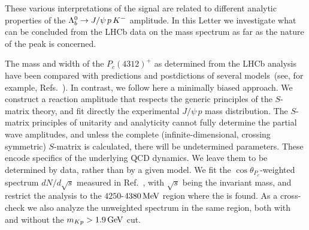 \documentclass[aps,prl,
twocolumn,nofootinbib,
superscriptaddress,preprintnumbers]{revtex4-1}
\begin{document}
These various interpretations of the \Pc signal are related to different analytic properties of the   $\Lambda_b^0 \to J/\psi\,p \,K^-$ amplitude.
   In this Letter we investigate what can be concluded from the LHCb data on the \jpsip mass spectrum as far as the nature of the \Pc peak is concerned. 
   
The mass and width of the $P_c(4312)^+$ as determined from the LHCb analysis have been compared with predictions and postdictions of several models~(see, for example, Refs.~\cite{Chen:2019asm,Chen:2019bip,Guo:2019fdo,Liu:2019tjn,Huang:2019jlf,Ali:2019npk,Giannuzzi:2019esi,Xiao:2019mvs,Shimizu:2019ptd,Guo:2019kdc,Xiao:2019aya}). In contrast, we follow here a minimally biased approach. We construct a reaction amplitude that respects the generic principles of the $S$-matrix theory, and fit directly the experimental $J/\psi\, p$ mass distribution. The $S$-matrix principles of unitarity and analyticity cannot fully determine the partial wave amplitudes, and  unless  the complete (infinite-dimensional, crossing symmetric) $S$-matrix is calculated, there will be 
 undetermined parameters. These encode specifics of the underlying QCD dynamics. We leave them to be determined by data, rather than by a given model. We fit the $\cos\theta_{P_c}$-weighted spectrum $dN/d\sqrt{s}$ 
     measured in Ref.~\cite{Aaij:2019vzc}, with $\sqrt{s}$   being the \jpsip    invariant mass, 
 and restrict the analysis to the $4250$-$4380{\mathrm{\,Me\kern -0.1em V}}$ region where the \Pc is found. 
As a cross-check we also analyze the unweighted \jpsip spectrum in the same region, 
both with and without the $m_{Kp} > 1.9{\mathrm{\,Ge\kern -0.1em V}}$ cut.
\end{document}
